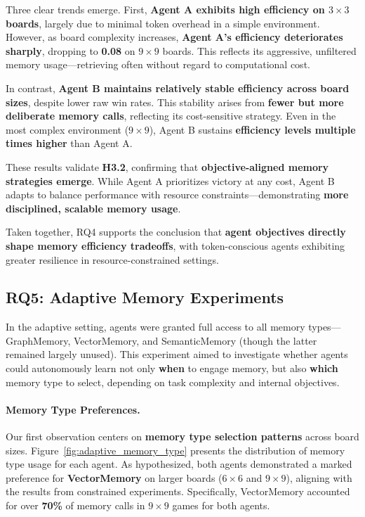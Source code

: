 \documentclass[10pt]{article}
\begin{document}
Three clear trends emerge. First, \textbf{Agent A exhibits high efficiency on $3\times3$ boards}, largely due to minimal token overhead in a simple environment. However, as board complexity increases, \textbf{Agent A's efficiency deteriorates sharply}, dropping to \textbf{0.08} on $9\times9$ boards. This reflects its aggressive, unfiltered memory usage---retrieving often without regard to computational cost.

In contrast, \textbf{Agent B maintains relatively stable efficiency across board sizes}, despite lower raw win rates. This stability arises from \textbf{fewer but more deliberate memory calls}, reflecting its cost-sensitive strategy. Even in the most complex environment ($9\times9$), Agent B sustains \textbf{efficiency levels multiple times higher} than Agent A.

These results validate \textbf{H3.2}, confirming that \textbf{objective-aligned memory strategies emerge}. While Agent A prioritizes victory at any cost, Agent B adapts to balance performance with resource constraints---demonstrating \textbf{more disciplined, scalable memory usage}.

Taken together, RQ4 supports the conclusion that \textbf{agent objectives directly shape memory efficiency tradeoffs}, with token-conscious agents exhibiting greater resilience in resource-constrained settings.

\subsection{RQ5: Adaptive Memory Experiments}

In the adaptive setting, agents were granted full access to all memory types—GraphMemory, VectorMemory, and SemanticMemory (though the latter remained largely unused). This experiment aimed to investigate whether agents could autonomously learn not only \textbf{when} to engage memory, but also \textbf{which} memory type to select, depending on task complexity and internal objectives.

\paragraph{Memory Type Preferences.}  
Our first observation centers on \textbf{memory type selection patterns} across board sizes. Figure~\ref{fig:adaptive_memory_type} presents the distribution of memory type usage for each agent. As hypothesized, both agents demonstrated a marked preference for \textbf{VectorMemory} on larger boards ($6\times6$ and $9\times9$), aligning with the results from constrained experiments. Specifically, VectorMemory accounted for over \textbf{70\%} of memory calls in $9\times9$ games for both agents.
\end{document}
